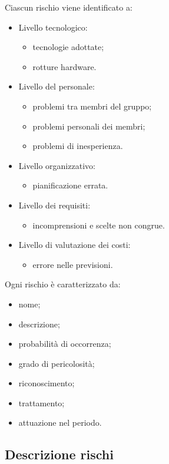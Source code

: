 Ciascun rischio viene identificato a:
\begin{itemize}
	\item Livello tecnologico:
	\begin{itemize}
		\item tecnologie adottate;
		\item rotture hardware.
	\end{itemize}
	\item Livello del personale:
	\begin{itemize}
		\item problemi tra membri del gruppo;
		\item problemi personali dei membri;
		\item problemi di inesperienza.
	\end{itemize}
	\item Livello organizzativo:
	\begin{itemize}
		\item pianificazione errata.
	\end{itemize}
	\item Livello dei requisiti:
	\begin{itemize}
		\item incomprensioni e scelte non congrue.
	\end{itemize}
	\item Livello di valutazione dei costi:
	\begin{itemize}
		\item errore nelle previsioni.
	\end{itemize}
\end{itemize}
Ogni rischio è caratterizzato da:
\begin{itemize}
	\item nome;
	\item descrizione;
	\item probabilità di occorrenza;
	\item grado di pericolosità;
	\item riconoscimento;
	\item trattamento;
	\item attuazione nel periodo.
\end{itemize}

\subsection{Descrizione rischi}


